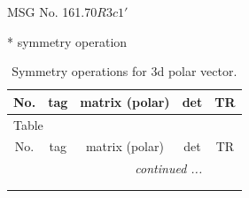\documentclass[fleqn,8pt]{jsarticle}
\begin{document}
\setcounter{MaxMatrixCols}{32}

\renewcommand{\tablename}{Table~}
\renewcommand{\figurename}{Figure~}
\begin{center}
\LARGE
MSG No. 161.70\quad$R3c1'$
\end{center}
* symmetry operation
\renewcommand{\arraystretch}{1.3}
\begin{longtable}{ccccc}
\caption{Symmetry operations for 3d polar vector.}
 \\
 \hline \hline
No. & tag & matrix (polar) & det & TR \\ \hline \endfirsthead

\multicolumn{4}{l}{\tablename\ \thetable{}} \\
 \hline \hline
No. & tag & matrix (polar) & det & TR \\ \hline \endhead

 \hline \hline
\multicolumn{4}{r}{\footnotesize\it continued ...} \\ \endfoot

 \hline \hline
\multicolumn{4}{r}{} \\ \endlastfoot


\end{longtable}
\end{document}

